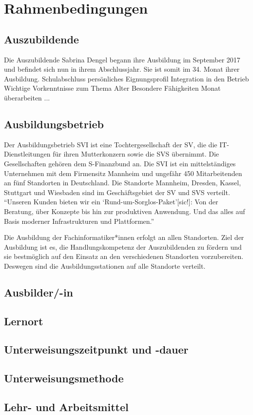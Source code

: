 \chapter{Rahmenbedingungen}

\section{Auszubildende}
Die Auszubildende Sabrina Dengel begann ihre Ausbildung im September 2017 und befindet sich nun in ihrem Abschlussjahr. Sie ist somit im 34. Monat ihrer Ausbildung. 
Schulabschluss
persönliches Eignungsprofil
Integration in den Betrieb 
Wichtige Vorkenntnisse zum Thema
Alter 
Besondere Fähigkeiten 
Monat überarbeiten ... 

\section{Ausbildungsbetrieb}
Der Ausbildungsbetrieb \ac{SVI} ist eine Tochtergesellschaft der \ac{SV}, die die IT-Dienstleitungen für ihren Mutterkonzern sowie die \ac{SVS} übernimmt. Die Gesellschaften gehören dem S-Finanzbund an. Die \ac{SVI} ist ein mittelständiges Unternehmen mit dem Firmensitz Mannheim und ungefähr 450 Mitarbeitenden\autocite[vgl.][]{sv_informatik_gmbg_uber_2020} an fünf Standorten in Deutschland. Die Standorte Mannheim, Dresden, Kassel, Stuttgart und Wiesbaden sind im Geschäftsgebiet der \ac{SV} und \ac{SVS} verteilt. \enquote{Unseren Kunden bieten wir ein \enquote{Rund-um-Sorglos-Paket}[sic!]: Von der Beratung, über Konzepte bis hin zur produktiven Anwendung. Und das alles auf Basis moderner Infrastrukturen und Plattformen.}\autocite{sv_informatik_gmbg_uber_2020}
\par
Die Ausbildung der Fachinformatiker*innen erfolgt an allen Standorten. Ziel der Ausbildung ist es, die Handlungskompetenz der Auszubildenden zu fördern und sie bestmöglich auf den Einsatz an den verschiedenen Standorten vorzubereiten. Deswegen sind die Ausbildungsstationen auf alle Standorte verteilt.

\section{Ausbilder/-in}

\section{Lernort}

\section{Unterweisungszeitpunkt und -dauer}

\section{Unterweisungsmethode}

\section{Lehr- und Arbeitsmittel}


